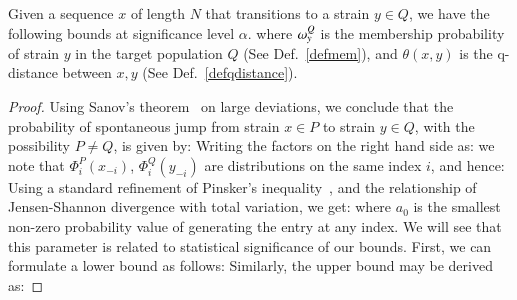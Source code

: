 \documentclass[onecolumn,10pt]{IEEEtran}
\begin{document}
\begin{thm}\label{thmbnd}
  Given a sequence  $x$ of length $N$ that transitions  to a strain $y\in Q$, we have the following bounds at significance level $\alpha$.
  where $\omega_{y}^Q$ is the membership probability of strain $y$ in the target population $Q$ (See Def.~\ref{defmem}), and $\theta(x,y)$ is the q-distance between $x,y$ (See Def.~\ref{defqdistance}).
\end{thm}
\begin{proof}
  Using Sanov's theorem~\cite{cover} on large deviations, we conclude that the probability of spontaneous jump from strain $x\in P$ to strain $y\in Q$, with the possibility $P \neq Q$, is given by:
  Writing the factors on the right hand side as:
  we note that $\Phi^P_i(x_{-i})$, $\Phi^Q_i(y_{-i})$ are distributions on the same index $i$, and hence:
  Using a standard refinement of Pinsker's inequality~\cite{fedotov2003refinements}, and the relationship of Jensen-Shannon divergence with  total variation, we get:
  where $a_0$ is the smallest non-zero probability value of generating the entry at any index. We will see that this parameter is related to statistical significance of our bounds. First, we can formulate a lower bound as follows:
  Similarly,  the upper bound may be derived as:

\end{proof}
\end{document}
